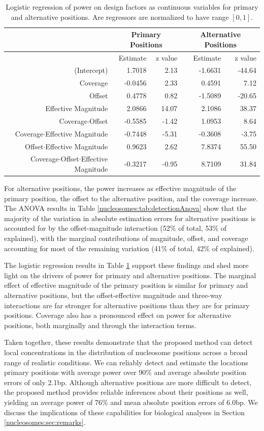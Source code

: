\begin{table}
\centering
\caption{Logistic regression of power on design factors as continuous variables
for primary and alternative positions. Are regressors are normalized
to have range $[0,1]$.
\label{nucleosomes:tab:detectionGlm}}
\begin{tabular}{r|rr|rr}
\hline 
 & \multicolumn{2}{c|}{Primary Positions} & \multicolumn{2}{c}{Alternative Positions}\tabularnewline
\hline 
 & Estimate  & z value  & Estimate  & z value \tabularnewline
\hline 
(Intercept)  & 1.7018  & 2.13  & -1.6631  & -44.64 \tabularnewline
Coverage & -0.0456  & 2.33  & 0.4591  & 7.12 \tabularnewline
Offset  & 0.4778  & 0.82  & -1.5089  & -20.65 \tabularnewline
Effective Magnitude  & 2.0866  & 14.07  & 2.1086  & 38.37 \tabularnewline
Coverage$\cdot$Offset  & -0.5585  & -1.42  & 1.0953  & 8.64 \tabularnewline
Coverage$\cdot$Effective Magnitude  & -0.7448  & -5.31  & -0.3608  & -3.75 \tabularnewline
Offset$\cdot$Effective Magnitude  & 0.9623  & 2.62  & 7.8374  & 55.50 \tabularnewline
Coverage$\cdot$Offset$\cdot$Effective Magnitude  & -0.3217  & -0.95  & 8.7109  & 31.84 \tabularnewline
\hline 
\end{tabular}
\end{table}

For alternative positions, the power increases as effective magnitude of the primary position, the offset to the alternative position, and the coverage increase.
The ANOVA results in Table \ref{nucleosomes:tab:detectionAnova} show that the majority of the variation in absolute estimation errors for alternative positions is accounted for by the offset-magnitude interaction (52\% of total, 53\% of explained), with the marginal contributions of magnitude, offset, and coverage accounting for most of the remaining variation (41\% of total, 42\% of explained).

The logistic regression results in Table \ref{nucleosomes:tab:detectionGlm} support these findings and shed more light on the drivers of power for primary and alternative positions.
The marginal effect of effective magnitude of the primary position is similar for primary and alternative positions, but the offset-effective magnitude and three-way interactions are far stronger for alternative positions than they are for primary positions.
Coverage also has a pronounced effect on power for alternative positions, both marginally and through the interaction terms.

Taken together, these results demonstrate that the proposed method can detect local concentrations in the distribution of nucleosome positions across a broad range of realistic conditions.
We can reliably detect and estimate the locations primary positions with average power over 90\% and average absolute position errors of only 2.1bp.
Although alternative positions are more difficult to detect, the proposed method provides reliable inferences about their positions as well, yielding an average power of 76\% and mean absolute position errors of 6.0bp.
We discuss the implications of these capabilities for biological analyses in Section \ref{nucleosomes:sec:remarks}.

